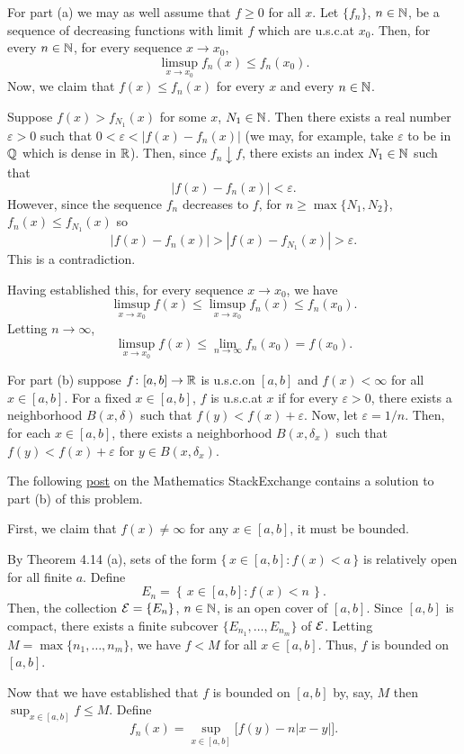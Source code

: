 \begin{solution}
  For part (a) we may as well assume that $f\geq 0$ for all $x$. Let
  $\{f_n\}$, $n\in\mathbb{N}$, be a sequence of decreasing functions with limit
  $f$ which are u.s.c.\@ at $x_0$. Then, for every $n\in\mathbb{N}$, for every
  sequence $x\to x_0$,
  \[
    \limsup_{x\to x_0}f_n(x)\leq f_n(x_0).
  \]
  Now, we claim that $f(x)\leq f_n(x)$ for every $x$ and every $n\in\mathbb{N}$.
  \begin{subproof}
    Suppose $f(x)>f_{N_1}(x)$ for some $x$, $N_1\in\mathbb{N}$. Then there exists
    a real number $\varepsilon>0$ such that $0<\varepsilon<|f(x)-f_n(x)|$
    (we may, for example, take $\varepsilon$ to be in $\mathbb{Q}$ which is dense
    in $\mathbb{R}$). Then, since $f_n\downarrow f$, there exists an index
    $N_1\in\mathbb{N}$ such that
    \[
      |f(x)-f_n(x)|<\varepsilon.
    \]
    However, since the sequence $f_n$ decreases to $f$, for
    $n\geq\max\{N_1,N_2\}$, $f_n(x)\leq f_{N_1}(x)$ so
    \[
      |f(x)-f_n(x)|>|f(x)-f_{N_1}(x)|>\varepsilon.
    \]
    This is a contradiction.
  \end{subproof}
  Having established this, for every sequence $x\to x_0$, we have
  \[
    \limsup_{x\to x_0} f(x)\leq \limsup_{x\to x_0} f_n(x)\leq f_n(x_0).
  \]
  Letting $n\to\infty$,
  \[
    \limsup_{x\to x_0} f(x)\leq \lim_{n\to\infty}f_n(x_0)=f(x_0).
  \]

  For part (b) suppose $f\colon [a,b]\to\mathbb{R}$ is u.s.c.\@ on $[a,b]$ and
  $f(x)<\infty$ for all $x\in [a,b]$. For a fixed $x\in[a,b]$, $f$ is
  u.s.c.\@ at $x$ if for every $\varepsilon>0$, there exists a neighborhood
  $B(x,\delta)$ such that $f(y)<f(x)+\varepsilon$. Now, let
  $\varepsilon=1/n$. Then, for each $x\in [a,b]$, there exists a
  neighborhood $B(x,\delta_x)$ such that $f(y)<f(x)+\varepsilon$ for
  $y\in B(x,\delta_x)$.

  The following
  \href{http://math.stackexchange.com/questions/462534/recognizing-uppersemicontinuous-function-as-a-pointwise-decreasing-limit}{post}
  on the Mathematics StackExchange contains a solution to part (b) of this
  problem.

  First, we claim that $f(x)\neq\infty$ for any $x\in[a,b]$, it must be
  bounded.
  \begin{subproof}
    By Theorem 4.14 (a), sets of the form $\{\,x\in[a,b]:f(x)<a\,\}$ is
    relatively open for all finite $a$. Define
    \[
      E_n=\left\{\,x\in [a,b]:f(x)<n\,\right\}.
    \]
    Then, the collection $\mathcal{E}=\{E_n\}$, $n\in\mathbb{N}$, is an open cover of
    $[a,b]$. Since $[a,b]$ is compact, there exists a finite subcover
    $\{E_{n_1},\ldots,E_{n_m}\}$ of $\mathcal{E}$. Letting
    $M=\max\{n_1,\ldots,n_m\}$, we have $f<M$ for all $x\in[a,b]$. Thus,
    $f$ is bounded on $[a,b]$.
  \end{subproof}\noindent
  Now that we have established that $f$ is bounded on $[a,b]$ by, say, $M$
  then $\sup_{x\in[a,b]} f\leq M$. Define
  \[
    f_n(x)=\sup_{x\in[a,b]}\bigl[f(y)-n|x-y|\bigr].
  \]
\end{solution}

